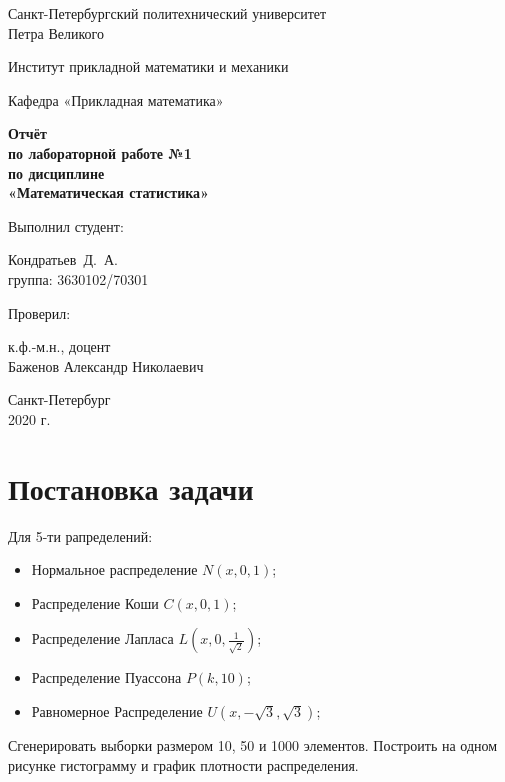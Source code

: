 \documentclass[12pt,a4paper]{article}
\begin{document}
	\begin{titlepage}
		\begin{center}			
			Санкт-Петербургский политехнический университет\\
			Петра Великого
			\vspace{0.25cm}
			
			Институт прикладной математики и механики
			
			Кафедра «Прикладная математика»
			\vfill
			
			\textbf{Отчёт\\
				по лабораторной работе №1\\
				по дисциплине\\
				«Математическая статистика»}\\[5mm]
			\bigskip
		\end{center}
		\vfill
		
		\hfill\begin{minipage}{0.45\textwidth}
			Выполнил студент:
			\vspace{0.2cm}
			
			Кондратьев~Д.~А.\\
			группа: 3630102/70301
		\end{minipage}%
		\bigskip
		
		\hfill\begin{minipage}{0.45\textwidth}
			Проверил:
			\vspace{0.2cm}
			
			к.ф.-м.н., доцент\\
			Баженов Александр Николаевич
		\end{minipage}%
		\vfill
		
		\begin{center}
			Санкт-Петербург\\
			2020 г.
		\end{center}
	\end{titlepage}
	
\tableofcontents{}
\listoffigures
\newpage

\section{Постановка задачи}

	Для 5-ти рапределений:
	\begin{itemize}
		\item Нормальное распределение $N(x,0,1)$;
		\item Распределение Коши $C(x,0,1)$;
		\item Распределение Лапласа $L( x,0,\frac{1}{\sqrt{2}})$;
		\item Распределение Пуассона $P(k, 10)$;
		\item Равномерное Распределение $U(x,-\sqrt{3}, \sqrt{3})$;
	\end{itemize}
	Сгенерировать выборки размером 10, 50 и 1000 элементов.
	Построить на одном рисунке гистограмму и график плотности распределения.
\end{document}

